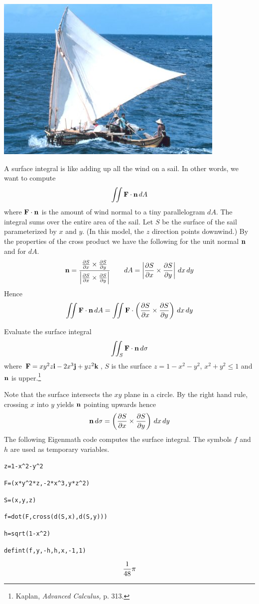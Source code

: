 
\newpage


\begin{center}
\includegraphics[scale=0.5]{sailboat.png}
\end{center}

\bigskip
\noindent
A surface integral is like adding up all the wind on a sail.
In other words, we want to compute
$$\int\!\!\!\int{\bf F\cdot n}\,dA$$
where ${\bf F\cdot n}$ is the amount of wind normal to a tiny parallelogram $dA$.
The integral sums over the entire area of the sail.
Let $S$ be the surface of the sail parameterized by $x$ and $y$.
(In this model, the $z$ direction points downwind.)
By the properties of the cross product we have the following for the unit normal $\bf n$
and for $dA$.
$${\bf n}={ {{\partial S\over\partial x}\times{\partial S\over\partial y}}\over
 {\left|{\partial S\over\partial x}\times{\partial S\over\partial y}\right|}}\qquad
dA=\left|{\partial S\over\partial x}\times{\partial S\over\partial y}\right|\,dx\,dy$$
Hence
$$\int\!\!\!\int{\bf F\cdot n}\,dA=\int\!\!\!\int{\bf F}\cdot
\left({{\partial S\over\partial x}\times{\partial S\over\partial y}}\right)\,dx\,dy$$

\newpage

\noindent
Evaluate the surface integral
$$\int\!\!\!\int_S{\bf F\cdot n}\,d\sigma$$
where ${\bf F}=xy^2z{\bf i}-2x^3{\bf j}+yz^2{\bf k}$, $S$ is the surface
$z=1-x^2-y^2$, $x^2+y^2\le1$ and $\bf n$ is upper.\footnote{
Kaplan, {\it Advanced Calculus,} p. 313.}

\medskip
\noindent
Note that the surface intersects the $xy$ plane in a circle.
By the right hand rule, crossing $x$ into $y$ yields $\bf n$ pointing upwards hence
$${\bf n}\,d\sigma=\left({{\partial S\over\partial x}\times{\partial S\over\partial y}}\right)\,dx\,dy$$
The following Eigenmath code computes the surface integral.
The symbols $f$ and $h$ are used as temporary variables.

\medskip
\verb$z=1-x^2-y^2$

\verb$F=(x*y^2*z,-2*x^3,y*z^2)$

\verb$S=(x,y,z)$

\verb$f=dot(F,cross(d(S,x),d(S,y)))$

\verb$h=sqrt(1-x^2)$

\verb$defint(f,y,-h,h,x,-1,1)$

$${1\over48}\pi$$

